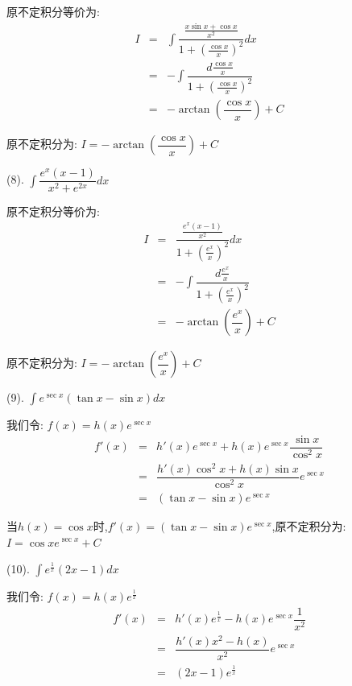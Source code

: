 \begin{anymark}[积分训练]
\begin{solution}
		原不定积分等价为:  
		\begin{eqnarray*}
			I&=&\int \dfrac{\frac{x\sin x+\cos x}{x^2}}{1+\left( \frac{\cos x}{x}\right)^2}dx\\
			&=&-\int \dfrac{d\frac{\cos x}{x}}{1+\left( \frac{\cos x}{x}\right)^2}\\
			&=&-\arctan(\dfrac{\cos x}{x})+C
		\end{eqnarray*}
	
		原不定积分为:  $I=-\arctan(\dfrac{\cos x}{x})+C$
	\end{solution}
	(8). $\int \dfrac{e^x(x-1)}{x^2+e^{2x}}dx$
	\begin{solution}
		
		原不定积分等价为:  
		\begin{eqnarray*}
			I&=&\dfrac{\frac{e^x(x-1)}{x^2}}{1+\left(\frac{e^x}{x}\right)^2}dx\\
			&=&-\int \dfrac{d\frac{e^x}{x}}{1+\left( \frac{e^x}{x}\right)^2}\\
			&=&-\arctan(\dfrac{e^x}{x})+C
		\end{eqnarray*}
		
		原不定积分为:  $I=-\arctan(\dfrac{e^x}{x})+C$
	\end{solution}
	(9). $\int e^{\sec x}(\tan x-\sin x)dx$
	\begin{solution}
		
		我们令:  $f(x)=h(x)e^{\sec x}$
		\begin{eqnarray*}
			f'(x)&=&h'(x)e^{\sec x}+h(x)e^{\sec x}\dfrac{\sin x}{\cos^2x}\\
			&=&\dfrac{h'(x)\cos^2x+h(x)\sin x}{\cos^2x}e^{\sec x}\\
			&=&(\tan x-\sin x)e^{\sec x}
		\end{eqnarray*}
		
		当$h(x)=\cos x$时,$f'(x)=(\tan x-\sin x)e^{\sec x}$,原不定积分为:  $I=\cos xe^{\sec x}+C$
	\end{solution}
	(10). $\int e^{\frac{1}{x}}(2x-1)dx$
	\begin{solution}
		
		我们令:  $f(x)=h(x)e^{\frac{1}{x}}$
		\begin{eqnarray*}
			f'(x)&=&h'(x)e^{\frac{1}{x}}-h(x)e^{\sec x}\dfrac{1}{x^2}\\
			&=&\dfrac{h'(x)x^2-h(x)}{x^2}e^{\sec x}\\
			&=&(2x-1)e^{\frac{1}{x}}
		\end{eqnarray*}
		

\end{solution}
\end{anymark}
